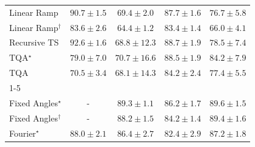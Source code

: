 \begin{tabular}{l|cccc|}
Linear Ramp & {\cellcolor[HTML]{802D05}} \color[HTML]{F1F1F1} $90.7\pm 1.5$ & {\cellcolor[HTML]{FEAF3D}} \color[HTML]{000000} $69.4\pm 2.0$ & {\cellcolor[HTML]{9C3604}} \color[HTML]{F1F1F1} $87.7\pm 1.6$ & {\cellcolor[HTML]{EE7617}} \color[HTML]{F1F1F1} $76.7\pm 5.8$ \\
Linear Ramp$^\dagger$ & {\cellcolor[HTML]{C44802}} \color[HTML]{F1F1F1} $83.6\pm 2.6$ & {\cellcolor[HTML]{FED36F}} \color[HTML]{000000} $64.4\pm 1.2$ & {\cellcolor[HTML]{C64902}} \color[HTML]{F1F1F1} $83.4\pm 1.4$ & {\cellcolor[HTML]{FEC95B}} \color[HTML]{000000} $66.0\pm 4.1$ \\
Recursive TS & {\cellcolor[HTML]{6C2706}} \color[HTML]{F1F1F1} $92.6\pm 1.6$ & {\cellcolor[HTML]{FEB541}} \color[HTML]{000000} $68.8\pm 12.3$ & {\cellcolor[HTML]{933204}} \color[HTML]{F1F1F1} $88.7\pm 1.9$ & {\cellcolor[HTML]{E56910}} \color[HTML]{F1F1F1} $78.5\pm 7.4$ \\
TQA$^\star$ & {\cellcolor[HTML]{E2650F}} \color[HTML]{F1F1F1} $79.0\pm 7.0$ & {\cellcolor[HTML]{FEA634}} \color[HTML]{000000} $70.7\pm 16.6$ & {\cellcolor[HTML]{943304}} \color[HTML]{F1F1F1} $88.5\pm 1.9$ & {\cellcolor[HTML]{BE4503}} \color[HTML]{F1F1F1} $84.2\pm 7.9$ \\
TQA & {\cellcolor[HTML]{FEA736}} \color[HTML]{000000} $70.5\pm 3.4$ & {\cellcolor[HTML]{FEBA46}} \color[HTML]{000000} $68.1\pm 14.3$ & {\cellcolor[HTML]{BE4503}} \color[HTML]{F1F1F1} $84.2\pm 2.4$ & {\cellcolor[HTML]{EC7014}} \color[HTML]{F1F1F1} $77.4\pm 5.5$ \\
\cline{1-5}
\multicolumn{5}{c}{\rule{0pt}{8pt}PP} \\
\midrule
Fixed Angles$^\star$ & {\cellcolor[HTML]{000000}} \color[HTML]{F1F1F1} {\cellcolor{white}} \color{black} - & {\cellcolor[HTML]{005F34}} \color[HTML]{F1F1F1} $89.3\pm 1.1$ & {\cellcolor[HTML]{0C723B}} \color[HTML]{F1F1F1} $86.2\pm 1.7$ & {\cellcolor[HTML]{005D33}} \color[HTML]{F1F1F1} $89.6\pm 1.5$ \\
Fixed Angles$^\dagger$ & {\cellcolor[HTML]{000000}} \color[HTML]{F1F1F1} {\cellcolor{white}} \color{black} - & {\cellcolor[HTML]{006737}} \color[HTML]{F1F1F1} $88.2\pm 1.5$ & {\cellcolor[HTML]{197C40}} \color[HTML]{F1F1F1} $84.2\pm 1.4$ & {\cellcolor[HTML]{005F34}} \color[HTML]{F1F1F1} $89.4\pm 1.6$ \\
Fourier$^\star$ & {\cellcolor[HTML]{006837}} \color[HTML]{F1F1F1} $88.0\pm 2.1$ & {\cellcolor[HTML]{0B713B}} \color[HTML]{F1F1F1} $86.4\pm 2.7$ & {\cellcolor[HTML]{258745}} \color[HTML]{F1F1F1} $82.4\pm 2.9$ & {\cellcolor[HTML]{066D39}} \color[HTML]{F1F1F1} $87.2\pm 1.8$ \\

\end{tabular}
